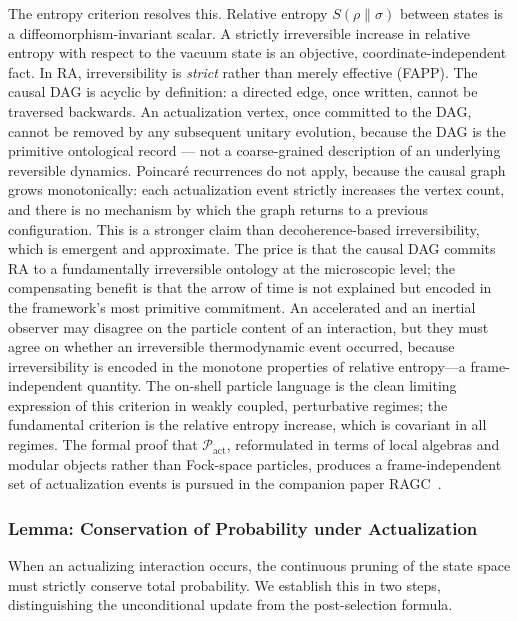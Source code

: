 \documentclass[11pt,a4paper]{article}
\theoremstyle{plain}
\theoremstyle{definition}
\theoremstyle{remark}
\begin{document}
The entropy criterion resolves this. Relative entropy $S(\rho \| \sigma)$
between states is a diffeomorphism-invariant scalar. A strictly irreversible
increase in relative entropy with respect to the vacuum state is an objective,
coordinate-independent fact.
In RA, irreversibility is \emph{strict} rather than merely effective (FAPP).
The causal DAG is acyclic by definition: a directed edge, once written,
cannot be traversed backwards. An actualization vertex, once committed to
the DAG, cannot be removed by any subsequent unitary evolution, because
the DAG is the primitive ontological record --- not a coarse-grained
description of an underlying reversible dynamics. Poincar\'e recurrences
do not apply, because the causal graph grows monotonically: each
actualization event strictly increases the vertex count, and there is no
mechanism by which the graph returns to a previous configuration.
This is a stronger claim than decoherence-based irreversibility, which
is emergent and approximate. The price is that the causal DAG commits RA
to a fundamentally irreversible ontology at the microscopic level; the
compensating benefit is that the arrow of time is not explained but
encoded in the framework's most primitive commitment. An accelerated and an inertial observer may disagree
on the particle content of an interaction, but they must agree on whether an
irreversible thermodynamic event occurred, because irreversibility is encoded in
the monotone properties of relative entropy---a frame-independent quantity.
The on-shell particle language is the clean limiting expression of this criterion
in weakly coupled, perturbative regimes; the fundamental criterion is the relative
entropy increase, which is covariant in all regimes. The formal proof that
$\mathcal{P}_{\mathrm{act}}$, reformulated in terms of local algebras and modular objects rather than
Fock-space particles, produces a frame-independent set of actualization events is
pursued in the companion paper RAGC~\citep{Sandeman2026RAGC}.

\subsubsection{Lemma: Conservation of Probability under Actualization}

When an actualizing interaction occurs, the continuous pruning of the state space
must strictly conserve total probability. We establish this in two steps,
distinguishing the unconditional update from the post-selection formula.
\end{document}
